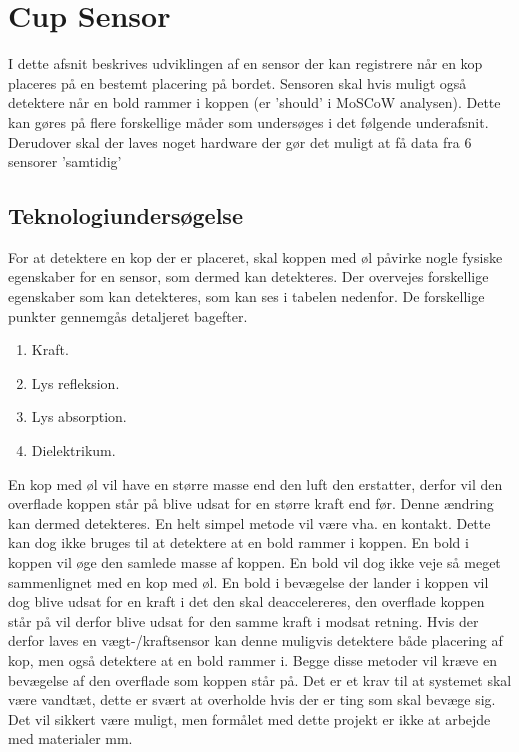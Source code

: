 \documentclass[HardwareDesign/HardwareDesign_main.tex]{subfiles}
\begin{document}
\section{Cup Sensor}
I dette afsnit beskrives udviklingen af en sensor der kan registrere når en kop placeres på en bestemt placering på bordet. Sensoren skal hvis muligt også detektere når en bold rammer i koppen (er 
'should' i MoSCoW analysen). Dette kan gøres på flere forskellige måder som undersøges i det følgende underafsnit. Derudover skal der laves noget hardware der gør det muligt at få data fra 6 sensorer 'samtidig'

\subsection{Teknologiundersøgelse}
For at detektere en kop der er placeret, skal koppen med øl påvirke nogle fysiske egenskaber for en sensor, som dermed kan detekteres. Der overvejes forskellige egenskaber som kan detekteres, som kan ses i tabelen nedenfor. De forskellige punkter gennemgås detaljeret bagefter.
\begin{enumerate}
    \item \label{itm:cupSensor_weight} Kraft.
    \item \label{itm:cupSensor_lightReflection} Lys refleksion. 
    \item \label{itm:cupSensor_lightAbsorbtion} Lys absorption.
    \item \label{itm:cupSensor_capacitive} Dielektrikum.
\end{enumerate}

En kop med øl vil have en større masse end den luft den erstatter, derfor vil den overflade koppen står på blive udsat for en større kraft end før. Denne ændring kan dermed detekteres. En helt simpel metode vil være vha. en kontakt. Dette kan dog ikke bruges til at detektere at en bold rammer i koppen. En bold i koppen vil øge den samlede masse af koppen. En bold vil dog ikke veje så meget sammenlignet med en kop med øl. En bold i bevægelse der lander i koppen vil dog blive udsat for en kraft i det den skal deaccelereres, den overflade koppen står på vil derfor blive udsat for den samme kraft i modsat retning. Hvis der derfor laves en vægt-/kraftsensor kan denne muligvis detektere både placering af kop, men også detektere at en bold rammer i. Begge disse metoder vil kræve en bevægelse af den overflade som koppen står på. Det er et krav til at systemet skal være vandtæt,  dette er svært at overholde hvis der er ting som skal bevæge sig. Det vil sikkert være muligt, men formålet med dette projekt er ikke at arbejde med materialer mm.
\end{document}
